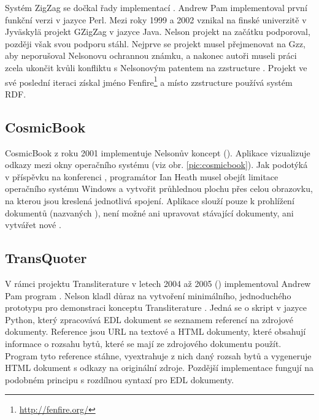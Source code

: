 Systém ZigZag se dočkal řady implementací \autocite[Table~1]{Nelson:ZigZag}. Andrew Pam implementoval první funkční verzi v jazyce Perl. Mezi roky 1999 a 2002 vznikal na finské univerzitě v Jyväskylä projekt GZigZag v jazyce Java. Nelson projekt na začátku podporoval, později však svou podporu stáhl. Nejprve se projekt musel přejmenovat na Gzz, aby neporušoval Nelsonovu ochrannou známku, a nakonec autoři museli práci zcela ukončit kvůli konfliktu s Nelsonovým patentem na zzstructure \autocites{Fenfire:History}{Fenfire:Gzz}. Projekt ve své poslední iteraci získal jméno Fenfire\footnote{\url{http://fenfire.org/}} a místo zzstructure používá systém RDF.



\subsection{CosmicBook}


CosmicBook z roku 2001 implementuje Nelsonův koncept  (). Aplikace vizualizuje odkazy mezi okny operačního systému (viz obr. \ref{pic:cosmicbook}). Jak podotýká \textcite{Nelson2015} v příspěvku na konferenci , programátor Ian Heath musel obejít limitace operačního systému Windows a vytvořit průhlednou plochu přes celou obrazovku, na kterou jsou kreslená jednotlivá spojení. Aplikace slouží pouze k prohlížení dokumentů (nazvaných ), není možné ani upravovat stávající dokumenty, ani vytvářet nové \autocite{Xanadu:CosmicBook}.


\subsection{TransQuoter}
\label{sec:transquoter}

V rámci projektu Transliterature v letech 2004 až 2005 () implementoval Andrew Pam program  \autocite{Transquoter}. Nelson kladl důraz na vytvoření minimálního, jednoduchého prototypu pro demonstraci konceptu Transliterature \autocite{dlitClientSpec}. Jedná se o skript v jazyce Python, který zpracovává EDL dokument se seznamem referencí na zdrojové dokumenty. Reference jsou URL na textové a HTML dokumenty, které obsahují informace o rozsahu bytů, které se mají ze zdrojového dokumentu použít. Program tyto reference stáhne, vyextrahuje z nich daný rozsah bytů a vygeneruje HTML dokument s odkazy na originální zdroje. Pozdější implementace fungují na podobném principu s rozdílnou syntaxí pro EDL dokumenty.

